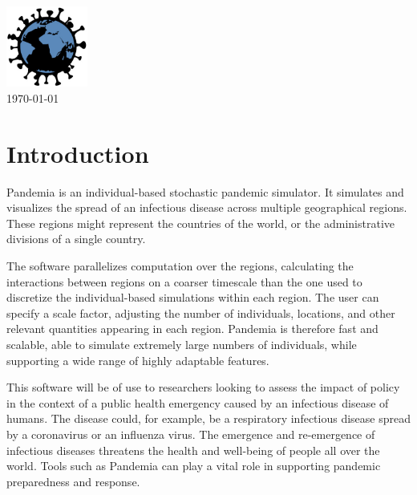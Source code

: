 \documentclass[10pt,letterpaper]{article}
\begin{document}


\vspace*{0.2in}

\begin{centering}
{\Huge\textbf{}}
\\
\bigskip
\includegraphics[width=0.2\textwidth]{pandemia_logo}
\\
\bigskip
\today
\\
\end{centering}

\tableofcontents

\section{Introduction}

Pandemia is an individual-based stochastic pandemic simulator. It simulates and visualizes the spread of an infectious disease across multiple geographical regions. These regions might represent the countries of the world, or the administrative divisions of a single country.

The software parallelizes computation over the regions, calculating the interactions between regions on a coarser timescale than the one used to discretize the individual-based simulations within each region. The user can specify a scale factor, adjusting the number of individuals, locations, and other relevant quantities appearing in each region. Pandemia is therefore fast and scalable, able to simulate extremely large numbers of individuals, while supporting a wide range of highly adaptable features.

This software will be of use to researchers looking to assess the impact of policy in the context of a public health emergency caused by an infectious disease of humans. The disease could, for example, be a respiratory infectious disease spread by a coronavirus or an influenza virus. The emergence and re-emergence of infectious diseases threatens the health and well-being of people all over the world. Tools such as Pandemia can play a vital role in supporting pandemic preparedness and response.
\end{document}
